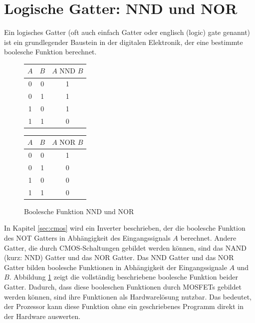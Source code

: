 \documentclass{scrarticle}
\numberwithin{equation}{section}
\begin{document}
\section{Logische Gatter: NND und NOR}
Ein logisches Gatter (oft auch einfach Gatter oder englisch (logic) gate genannt) ist ein grundlegender Baustein in der digitalen Elektronik, der eine bestimmte boolesche Funktion berechnet.
\begin{figure}[ht]
	\begin{minipage}[t]{0.5\textwidth}
		\centering
		\begin{tabular}{c|c||c}
			\hline
			$A$ & $B$ & $A \text{ NND } B$ \\
			\hline\hline
			0 & 0 & 1 \\
			0 & 1 & 1 \\
			1 & 0 & 1 \\
			1 & 1 & 0 \\
			\hline
		\end{tabular}
	\end{minipage}
	\hfill %
	\begin{minipage}[t]{0.5\textwidth}
		\centering
		\begin{tabular}{c|c||c}
			\hline
			$A$ & $B$ & $A \text{ NOR } B$ \\
			\hline\hline
			0 & 0 & 1 \\
			0 & 1 & 0 \\
			1 & 0 & 0 \\
			1 & 1 & 0 \\
			\hline
		\end{tabular}
	\end{minipage}
	\caption{Boolesche Funktion NND und NOR}
\label{fig:nand-nor}
\end{figure}
In Kapitel \ref{sec:cmos} wird ein Inverter beschrieben, der die boolesche Funktion des NOT Gatters in Abhängigkeit des Eingangssignals $A$ berechnet. Andere Gatter, die durch CMOS-Schaltungen gebildet werden können, sind das NAND (kurz: NND) Gatter und das NOR Gatter. Das NND Gatter und das NOR Gatter bilden boolesche Funktionen in Abhängigkeit der Eingangssignale $A$ und $B$. Abbildung \ref{fig:nand-nor} zeigt die vollständig beschriebene boolesche Funktion beider Gatter. Dadurch, dass diese booleschen Funktionen durch MOSFETs gebildet werden können, sind ihre Funktionen als Hardwarelösung nutzbar. Das bedeutet, der Prozessor kann diese Funktion ohne ein geschriebenes Programm direkt in der Hardware auswerten.
\end{document}
